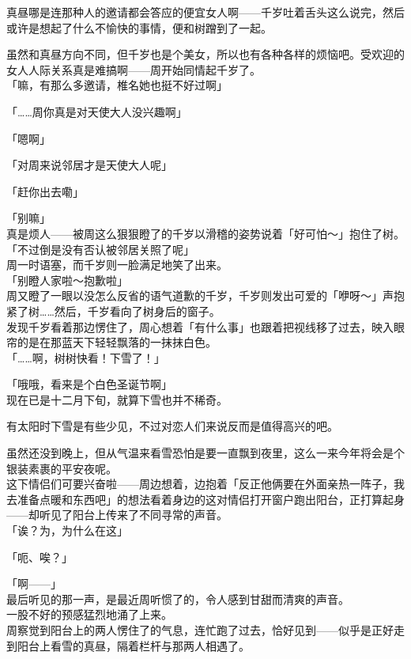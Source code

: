 真昼哪是连那种人的邀请都会答应的便宜女人啊——千岁吐着舌头这么说完，然后或许是想起了什么不愉快的事情，便和树蹭到了一起。

虽然和真昼方向不同，但千岁也是个美女，所以也有各种各样的烦恼吧。受欢迎的女人人际关系真是难搞啊——周开始同情起千岁了。\\

「嘛，有那么多邀请，椎名她也挺不好过啊」

「……周你真是对天使大人没兴趣啊」

「嗯啊」

「对周来说邻居才是天使大人呢」

「赶你出去嘞」

「别嘛」\\

真是烦人——被周这么狠狠瞪了的千岁以滑稽的姿势说着「好可怕～」抱住了树。\\

「不过倒是没有否认被邻居关照了呢」\\

周一时语塞，而千岁则一脸满足地笑了出来。\\

「别瞪人家啦～抱歉啦」\\

周又瞪了一眼以没怎么反省的语气道歉的千岁，千岁则发出可爱的「咿呀～」声抱紧了树……然后，千岁看向了树身后的窗子。\\

发现千岁看着那边愣住了，周心想着「有什么事」也跟着把视线移了过去，映入眼帘的是在那蓝天下轻轻飘落的一抹抹白色。\\

「……啊，树树快看！下雪了！」

「哦哦，看来是个白色圣诞节啊」\\

现在已是十二月下旬，就算下雪也并不稀奇。

有太阳时下雪是有些少见，不过对恋人们来说反而是值得高兴的吧。

虽然还没到晚上，但从气温来看雪恐怕是要一直飘到夜里，这么一来今年将会是个银装素裹的平安夜呢。\\

这下情侣们可要兴奋啦——周边想着，边抱着「反正他俩要在外面亲热一阵子，我去准备点暖和东西吧」的想法看着身边的这对情侣打开窗户跑出阳台，正打算起身——却听见了阳台上传来了不同寻常的声音。\\

「诶？为，为什么在这」

「呃、唉？」

「啊——」\\

最后听见的那一声，是最近周听惯了的，令人感到甘甜而清爽的声音。\\

一股不好的预感猛烈地涌了上来。\\

周察觉到阳台上的两人愣住了的气息，连忙跑了过去，恰好见到——似乎是正好走到阳台上看雪的真昼，隔着栏杆与那两人相遇了。
